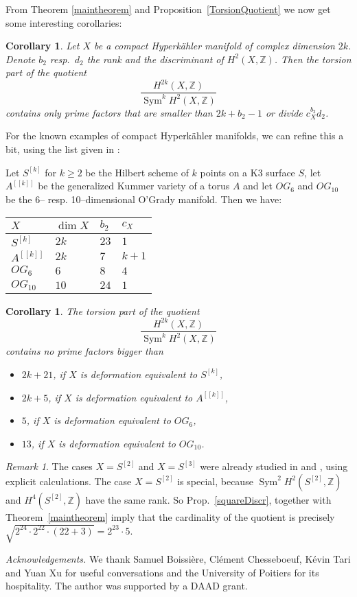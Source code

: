 \documentclass{amsart}
\DeclareMathOperator{\Sym}{Sym}
\newcommand{\Z}{\mathbb{Z}}
\theoremstyle{plain}
\newtheorem{corollary}[theorem]{Corollary}
\theoremstyle{definition}
\theoremstyle{remark}
\newtheorem{remark}[theorem]{Remark}
\begin{document}
From Theorem \ref{maintheorem} and Proposition~\ref{TorsionQuotient} we now get some interesting corollaries:
\begin{corollary}
Let $X$ be a compact Hyperk\"ahler manifold of complex dimension $2k$. Denote $b_2$ resp.~$d_2$ the rank and the discriminant of $H^2(X,\Z)$. Then the torsion part of the quotient
$$
\frac{H^{2k}(X,\Z)}{\Sym^kH^2(X,\Z)}
$$
contains only prime factors that are smaller than $2k+b_2-1$ or divide $c_X^{b_2} d_2$. 
\end{corollary}
For the known examples of compact Hyperk\"ahler manifolds, we can refine this a bit, using the list given in \cite[Table~1]{OGrady}:

Let $S^{[k]}$ for $k\geq 2$ be the Hilbert scheme of $k$ points on a K3 surface $S$, let $A^{[[k]]}$ be the generalized Kummer variety of a torus $A$ and let $OG_6$ and $OG_{10}$ be the 6-- resp. 10--dimensional O'Grady manifold. Then we have:

\begin{center}
\begin{tabular}{ p{2cm} p{2cm} p{2cm} p{2cm} }
$X$ 		& $\dim X$	& $b_2$ & $c_X$ \\ \hline 
$S^{[k]}$ 	& $2k$ 		& $23$ 	& $1$	\\
$A^{[[k]]}$	& $2k$ 		& $7$	& $k+1$ \\
$OG_6$		& $6$		& $8$	& $4$ 	\\
$OG_{10}$	& $10$		& $24$	& $1$ 	
\end{tabular}
\end{center}

\begin{corollary}
 The torsion part of the quotient
$$
\frac{H^{2k}(X,\Z)}{\Sym^kH^2(X,\Z)}
$$
contains no prime factors bigger than
\begin{itemize}
\item $2k+21$, if $X$ is deformation equivalent to $S^{[k]}$,
\item $2k+5$, if $X$ is deformation equivalent to $A^{[[k]]}$, 
\item $5$, if $X$ is deformation equivalent to $OG_6$,
\item $13$, if $X$ is deformation equivalent to $OG_{10}$.
\end{itemize} 
\end{corollary}
\begin{remark}
The cases $X=S^{[2]}$ and $X=S^{[3]}$ were already studied in \cite[Prop.~6.6]{BNS} and \cite[Prop.~2.4]{Kapfer}, using explicit calculations. The case $X=S^{[2]}$ is special, because $\Sym^2H^2(S^{[2]},\Z)$ and $H^4(S^{[2]},\Z)$ have the same rank. So Prop.~\ref{squareDiscr}, together with Theorem~\ref{maintheorem} imply that the cardinality of the quotient is precisely $\sqrt{2^{24}\cdot2^{22}\cdot(22+3)} = 2^{23}\cdot5$.
\end{remark}

\emph{Acknowledgements.} We thank Samuel Boissi\`ere, Cl\'ement Chesseboeuf, K\'evin Tari and Yuan Xu for useful conversations and the University of Poitiers for its hospitality. The author was supported by a DAAD grant.



\end{document}
